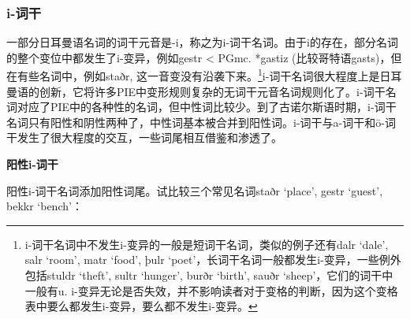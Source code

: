 \subsubsection{i-词干}\label{i-ux8bcdux5e72}

一部分日耳曼语名词的词干元音是-i，称之为i-词干名词。由于i的存在，部分名词的整个变位中都发生了i-变异，例如gestr
\textless{} PGmc. *gastiz (比较哥特语gasts)，但在有些名词中，例如staðr,
这一音变没有沿袭下来。\footnote{i-词干名词中不发生i-变异的一般是短词干名词，类似的例子还有dalr
  `dale', salr `room', matr `food', þulr
  `poet'，长词干名词一般都发生i-变异，一些例外包括stuldr `theft', sultr
  `hunger', burðr `birth', sauðr `sheep'，它们的词干中一般有u.
  i-变异无论是否失效，并不影响读者对于变格的判断，因为这个变格表中要么都发生i-变异，要么都不发生i-变异。}i-词干名词很大程度上是日耳曼语的创新，它将许多PIE中变形规则复杂的无词干元音名词规则化了。i-词干名词对应了PIE中的各种性的名词，但中性词比较少。到了古诺尔斯语时期，i-词干名词只有阳性和阴性两种了，中性词基本被合并到阳性词。i-词干与a-词干和ō-词干发生了很大程度的交互，一些词尾相互借鉴和渗透了。

\textbf{阳性i-词干}

阳性i-词干名词添加阳性词尾。试比较三个常见名词staðr `place', gestr
`guest', bekkr `bench'：

